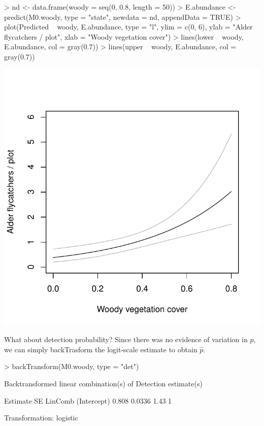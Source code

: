 \documentclass[a4paper]{article}
\renewenvironment{Schunk}{\vspace{\topsep}}{\vspace{\topsep}}
\begin{document}
\begin{Schunk}
\begin{Sinput}
> nd <- data.frame(woody = seq(0, 0.8, length = 50))
> E.abundance <- predict(M0.woody, type = "state", newdata = nd, 
     appendData = TRUE)
> plot(Predicted ~ woody, E.abundance, type = "l", ylim = c(0, 
     6), ylab = "Alder flycatchers / plot", xlab = "Woody vegetation cover")
> lines(lower ~ woody, E.abundance, col = gray(0.7))
> lines(upper ~ woody, E.abundance, col = gray(0.7))
\end{Sinput}
\end{Schunk}
\includegraphics{cap-recap-012}


What about detection probability? Since there was no evidence of
variation in $p$, we can simply backTrasform the logit-scale estimate
to obtain $\hat{p}$.

\begin{Schunk}
\begin{Sinput}
> backTransform(M0.woody, type = "det")
\end{Sinput}
\begin{Soutput}
Backtransformed linear combination(s) of Detection estimate(s)

 Estimate     SE LinComb (Intercept)
    0.808 0.0336    1.43           1

Transformation: logistic 
\end{Soutput}
\end{Schunk}
\end{document}
